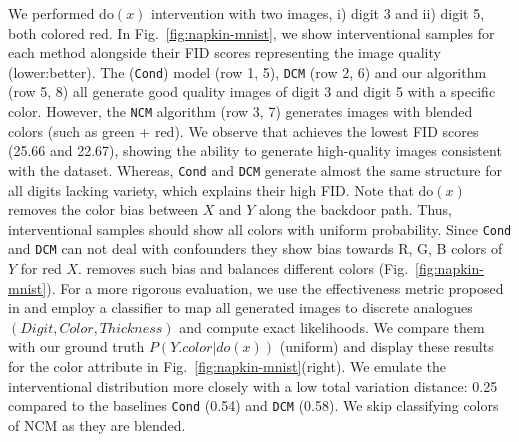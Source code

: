 \documentclass{article}
\newcommand{\Do}{\text{do}}
\newcommand{\idgen}{\text{ID-GEN}\xspace}
\theoremstyle{plain}
\theoremstyle{definition}
\theoremstyle{remark}
\begin{document}
%
%
We performed $\Do(x)$ intervention with two images, i) digit 3 and ii) digit 5, both colored red. In Fig.~\ref{fig:napkin-mnist}, we show interventional samples for each method alongside their FID scores representing the image quality (lower:better).
%
The (\texttt{Cond}) model (row 1, 5), \texttt{DCM} (row 2, 6)  and our algorithm (row 5, 8) all generate good quality images of digit 3 and digit 5 with a specific color.
However, the \texttt{NCM} algorithm (row 3, 7) generates images with blended colors (such as green + red).
We observe that \idgen achieves the lowest FID scores (25.66 and 22.67), showing the ability to generate high-quality images consistent with the dataset. 
Whereas, \texttt{Cond} and \texttt{DCM} generate almost the same structure for all digits lacking variety, which explains their high FID.
%
%
%
Note that $\Do(x)$ removes the color bias between $X$ and $Y$ along the backdoor path. Thus, interventional samples should show all colors with uniform probability. Since \texttt{Cond} and \texttt{DCM} can not deal with confounders they show bias towards R, G, B colors of $Y$ for red $X$. \idgen removes such bias and balances different colors (Fig.~\ref{fig:napkin-mnist}). For a more rigorous evaluation, we use the effectiveness metric proposed in \cite{monteiro2023measuring} and
employ a classifier to map all generated images to discrete analogues $(Digit, Color, Thickness)$ and compute exact likelihoods. We compare them with our ground truth $P(Y.color|do(x))$ (uniform) and display these results for the color attribute in Fig.~\ref{fig:napkin-mnist}(right). We emulate the interventional distribution more closely with a low total variation distance: 0.25 compared to the baselines \texttt{Cond} (0.54) and \texttt{DCM} (0.58). We skip classifying colors of NCM as they are blended.
%
%
%
%
\end{document}
